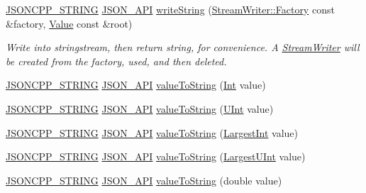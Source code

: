\begin{DoxyCompactItemize}
\hyperlink{config_8h_a1e723f95759de062585bc4a8fd3fa4be}{J\+S\+O\+N\+C\+P\+P\+\_\+\+S\+T\+R\+I\+NG} \hyperlink{config_8h_a1d61ffde86ce1a18fd83194ff0d9a206}{J\+S\+O\+N\+\_\+\+A\+PI} \hyperlink{namespace_json_aabe79c4d15b195a343b06825693b0a16}{write\+String} (\hyperlink{class_json_1_1_stream_writer_1_1_factory}{Stream\+Writer\+::\+Factory} const \&factory, \hyperlink{class_json_1_1_value}{Value} const \&root)
\begin{DoxyCompactList}\small\item\em Write into stringstream, then return string, for convenience. A \hyperlink{class_json_1_1_stream_writer}{Stream\+Writer} will be created from the factory, used, and then deleted. \end{DoxyCompactList}\item 
\hyperlink{config_8h_a1e723f95759de062585bc4a8fd3fa4be}{J\+S\+O\+N\+C\+P\+P\+\_\+\+S\+T\+R\+I\+NG} \hyperlink{config_8h_a1d61ffde86ce1a18fd83194ff0d9a206}{J\+S\+O\+N\+\_\+\+A\+PI} \hyperlink{namespace_json_a4ed9732688b3c3dcaec309c9baddeac9}{value\+To\+String} (\hyperlink{namespace_json_a08122e8005b706d982e48cca1e2119c7}{Int} value)
\item 
\hyperlink{config_8h_a1e723f95759de062585bc4a8fd3fa4be}{J\+S\+O\+N\+C\+P\+P\+\_\+\+S\+T\+R\+I\+NG} \hyperlink{config_8h_a1d61ffde86ce1a18fd83194ff0d9a206}{J\+S\+O\+N\+\_\+\+A\+PI} \hyperlink{namespace_json_a99bc401be7f8a09a8439f3e7219b1f12}{value\+To\+String} (\hyperlink{namespace_json_a800fb90eb6ee8d5d62b600c06f87f7d4}{U\+Int} value)
\item 
\hyperlink{config_8h_a1e723f95759de062585bc4a8fd3fa4be}{J\+S\+O\+N\+C\+P\+P\+\_\+\+S\+T\+R\+I\+NG} \hyperlink{config_8h_a1d61ffde86ce1a18fd83194ff0d9a206}{J\+S\+O\+N\+\_\+\+A\+PI} \hyperlink{namespace_json_a77501ed00903d1b183a55a5fbf6b749a}{value\+To\+String} (\hyperlink{namespace_json_a218d880af853ce786cd985e82571d297}{Largest\+Int} value)
\item 
\hyperlink{config_8h_a1e723f95759de062585bc4a8fd3fa4be}{J\+S\+O\+N\+C\+P\+P\+\_\+\+S\+T\+R\+I\+NG} \hyperlink{config_8h_a1d61ffde86ce1a18fd83194ff0d9a206}{J\+S\+O\+N\+\_\+\+A\+PI} \hyperlink{namespace_json_a9a0432e5ac3dd69b6c7f29db7776ef21}{value\+To\+String} (\hyperlink{namespace_json_ae202ecad69725e23443f465e257456d0}{Largest\+U\+Int} value)
\item 
\hyperlink{config_8h_a1e723f95759de062585bc4a8fd3fa4be}{J\+S\+O\+N\+C\+P\+P\+\_\+\+S\+T\+R\+I\+NG} \hyperlink{config_8h_a1d61ffde86ce1a18fd83194ff0d9a206}{J\+S\+O\+N\+\_\+\+A\+PI} \hyperlink{namespace_json_aa99b8b8dc736259e5a229a4e61d7ea92}{value\+To\+String} (double value)

\end{DoxyCompactItemize}
